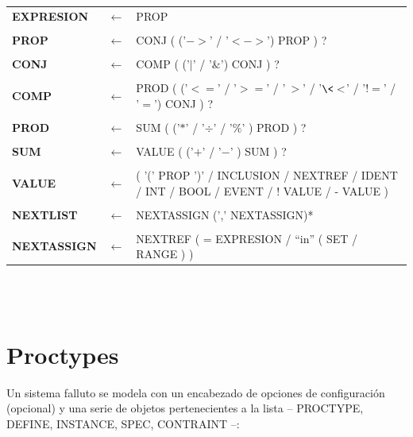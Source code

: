 \documentclass[titlepage, 12pt]{book}
\begin{document}
\begin{tabularx}{\textwidth}{>{\bfseries}llX }

EXPRESION & $\longleftarrow$ & PROP\\\\
PROP & $\longleftarrow$ & CONJ ( ('$->$' / '$<->$') PROP ) ?\\\\
CONJ & $\longleftarrow$ & COMP ( ('$|$' / '$\&$') CONJ ) ?\\\\
COMP & $\longleftarrow$ & PROD ( ('$<=$' / '$>=$' / '$\>>$' / '$\<<$' / '$!=$' / '$=$') CONJ ) ?\\\\
PROD & $\longleftarrow$ & SUM ( ('$*$' / '$\div$' / '$\%$' ) PROD ) ?\\\\
SUM & $\longleftarrow$ & VALUE ( ('$+$' / '$-$' ) SUM ) ?\\\\
VALUE & $\longleftarrow$  & ( '(' PROP ')' / INCLUSION / NEXTREF / IDENT / INT / BOOL / EVENT / ! VALUE / - VALUE ) \\\\
NEXTLIST & $\longleftarrow$  & NEXTASSIGN (',' NEXTASSIGN)*\\\\
NEXTASSIGN & $\longleftarrow$  & NEXTREF ( = EXPRESION / ``in'' ( SET / RANGE ) )\\
\end{tabularx}
~\\\\




\section{Proctypes}
Un sistema falluto se modela con un encabezado de opciones de configuraci\'on (opcional) y una serie de objetos pertenecientes a la lista -- PROCTYPE, DEFINE, INSTANCE, SPEC, CONTRAINT --:\\\\
\end{document}
